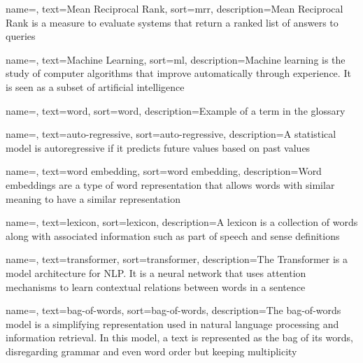 {
    name=,
    text=Mean Reciprocal Rank,
    sort=mrr,
    description={Mean Reciprocal Rank is a measure to evaluate systems that return a ranked list of answers to queries}
}

{
    name=,
    text=Machine Learning,
    sort=ml,
    description={Machine learning is the study of computer algorithms that improve automatically through experience. It is seen as a subset of artificial intelligence}
}





{
    name=,
    text=word,
    sort=word,
    description={Example of a term in the glossary}
}

{
    name=,
    text=auto-regressive,
    sort=auto-regressive,
    description={A statistical  model is autoregressive if it predicts future values based on past values}
}

{
    name=,
    text=word embedding,
    sort=word embedding,
    description={Word embeddings are a type of word representation that allows words with similar meaning to have a similar representation}
}

{
    name=,
    text=lexicon,
    sort=lexicon,
    description={A lexicon is a collection of words along with associated information such as part of speech and sense definitions}
}


{
    name=,
    text=transformer,
    sort=transformer,
    description={The Transformer is a model architecture for NLP. It is a neural network that uses attention mechanisms to learn contextual relations between words in a sentence}
}

{
    name=,
    text=bag-of-words,
    sort=bag-of-words,
    description={The bag-of-words model is a simplifying representation used in natural language processing and information retrieval. In this model, a text is represented as the bag of its words, disregarding grammar and even word order but keeping multiplicity}
}

